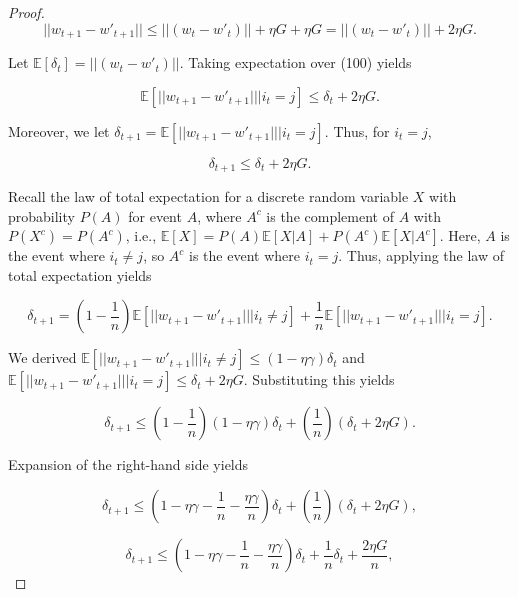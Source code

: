 \documentclass[10pt,a4paper]{amsart}
\begin{document}
\begin{proof}
\begin{equation}
||w_{t+1} - w'_{t+1}|| \leq ||(w_t - w'_t)|| +  \eta G + \eta G = ||(w_t - w'_t)|| + 2\eta G.  
\end{equation}

\noindent
Let $\mathbb{E}[\delta_t] = ||(w_t - w'_t)||$. Taking expectation over (100) yields

\begin{equation}
\mathbb{E}[||w_{t+1} - w'_{t+1}|| | i_t = j] \leq \delta_t + 2 \eta G.
\end{equation}

\noindent
Moreover, we let $\delta_{t+1} = \mathbb{E}[||w_{t+1} - w'_{t+1}|| | i_t = j]$. Thus, for $i_t = j$, 

\begin{equation}
\delta_{t+1} \leq \delta_t + 2 \eta G.
\end{equation}

\noindent
Recall the law of total expectation for a discrete random variable $X$ with probability $P(A)$ for event $A$, where $A^c$ is the complement of $A$ with $P(X^c) = P(A^c)$, i.e., $\mathbb{E}[X] = P(A)\mathbb{E}[X|A] + P(A^c)\mathbb{E}[X|A^c]$. Here, $A$ is the event where $i_t \neq j$, so $A^c$ is the event where $i_t = j$. Thus, applying the law of total expectation yields

\begin{equation}
\delta_{t+1} = (1-\frac{1}{n})\mathbb{E}[||w_{t+1} - w'_{t+1}|| | i_t \neq j] + \frac{1}{n}\mathbb{E}[||w_{t+1} - w'_{t+1}|| | i_t = j].
\end{equation}

\noindent
We derived $\mathbb{E}[||w_{t+1} - w'_{t+1}|| | i_t \neq j] \leq (1-\eta\gamma)\delta_t$ and $\mathbb{E}[||w_{t+1} - w'_{t+1}|| | i_t = j] \leq \delta_t + 2\eta G$. Substituting this yields

\begin{equation}
\delta_{t+1} \leq (1-\frac{1}{n})(1-\eta\gamma)\delta_t + (\frac{1}{n})(\delta_t + 2\eta G).
\end{equation}

\noindent
Expansion of the right-hand side yields

\begin{equation}
\delta_{t+1} \leq (1 - \eta\gamma - \frac{1}{n} - \frac{\eta \gamma}{n})\delta_t + (\frac{1}{n})(\delta_t + 2\eta G),
\end{equation}

\begin{equation}
\delta_{t+1} \leq (1 - \eta\gamma - \frac{1}{n} - \frac{\eta \gamma}{n})\delta_t + \frac{1}{n}\delta_t + \frac{2\eta G}{n},
\end{equation}


\end{proof}
\end{document}
